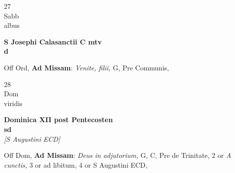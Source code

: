 \documentclass[10pt, openany]{book}
\begin{document}
        \begin{center}
            \begin{minipage}{3.5in}
                \vspace{2em}
                \begin{minipage}{0.5in}
                    {\Huge 27} \\
                    {\normalsize Sabb} \\
                    {\normalsize albus}
                \end{minipage}
                \begin{minipage}{3.0in}
                    \textbf{ \large S Josephi Calasanctii C mtv \\
                    \textnormal{\normalsize d}} \\ 
                \end{minipage}
                \begin{justify}Off Ord, \textbf{Ad Missam}: \textit{Venite, filii,} G, Pre Communis,   
                \end{justify}
            \end{minipage}
        \end{center}
    
        \begin{center}
            \begin{minipage}{3.5in}
                \vspace{2em}
                \begin{minipage}{0.5in}
                    {\Huge 28} \\
                    {\normalsize Dom} \\
                    {\normalsize viridis}
                \end{minipage}
                \begin{minipage}{3.0in}
                    \textbf{ \large Dominica XII post Pentecosten \\
                    \textnormal{\normalsize sd}} \\ \textit{[S Augustini ECD]} \\ 
                \end{minipage}
                \begin{justify}Off Dom, \textbf{Ad Missam}: \textit{Deus in adjutorium,} G, C, Pre de Trinitate, 2 or \textit{A cunctis,} 3 or ad libitum, 4 or S Augustini ECD,   
                \end{justify}
            \end{minipage}
        \end{center}
    
\end{document}
